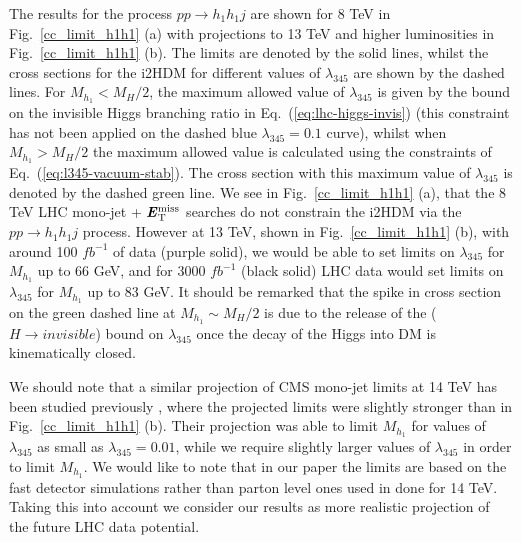\documentclass[12pt,a4paper]{article}
\newcommand{\MET}{\textbf{\textit{E}$_{\rm T}^{\rm miss}$}}
\begin{document}
The results for the process $pp\rightarrow h_1h_1 j$ are shown for 8 TeV in Fig.~\ref{cc_limit_h1h1} (a) with projections to 13 TeV and higher luminosities in Fig.~\ref{cc_limit_h1h1} (b). The limits are denoted by the solid lines, whilst the cross sections for the i2HDM for different values of $\lambda_{345}$ are shown by the dashed lines. For $M_{h_1} < M_H/2$, the maximum allowed value of $\lambda_{345}$ is given by the bound on the invisible Higgs branching ratio in Eq.~(\ref{eq:lhc-higgs-invis}) (this constraint has not been applied on the dashed blue $\lambda_{345} = 0.1$ curve), whilst when $M_{h_1} > M_H/2$ the maximum allowed value is calculated using the constraints of Eq.~(\ref{eq:l345-vacuum-stab}). The cross section with this maximum value of $\lambda_{345}$ is denoted by the dashed green line. We see in Fig.~\ref{cc_limit_h1h1} (a), that the 8 TeV LHC mono-jet + $\MET{}$ searches do not constrain the i2HDM via the $pp\rightarrow h_1h_1 j$ process. However at 13 TeV, shown in Fig.~\ref{cc_limit_h1h1} (b), with around 100 $fb^{-1}$ of data (purple solid), we would be able to set limits on $\lambda_{345}$ for $M_{h_1}$ up to 66 GeV, and for 3000 $fb^{-1} $ (black solid) LHC data would set limits on $\lambda_{345}$ for $M_{h_1}$ up to 83 GeV. 
It should be remarked that the spike in cross section on the green dashed line at $M_{h_1} \sim M_H/2$ is due to the release of the ($H \to invisible$) bound on $\lambda_{345}$ once the decay of the Higgs into DM is kinematically closed.


We should note that a similar projection of CMS mono-jet limits \cite{Khachatryan:2014rra} at 14 TeV has been studied previously \cite{Arhrib:2013ela}, where the projected limits were slightly stronger than in Fig.~\ref{cc_limit_h1h1} (b). Their projection was able to limit $M_{h_1}$ for values of $\lambda_{345}$ as small as $\lambda_{345} = 0.01$, while we require slightly larger values of $\lambda_{345}$ in order to limit $M_{h_1}$. 
We would like to note that in our paper the limits are based on the fast detector simulations rather than parton level 
ones used in \cite{Arhrib:2013ela} done for  14 TeV. Taking this into account we consider our results as more realistic
projection of the future LHC data potential.
\end{document}

